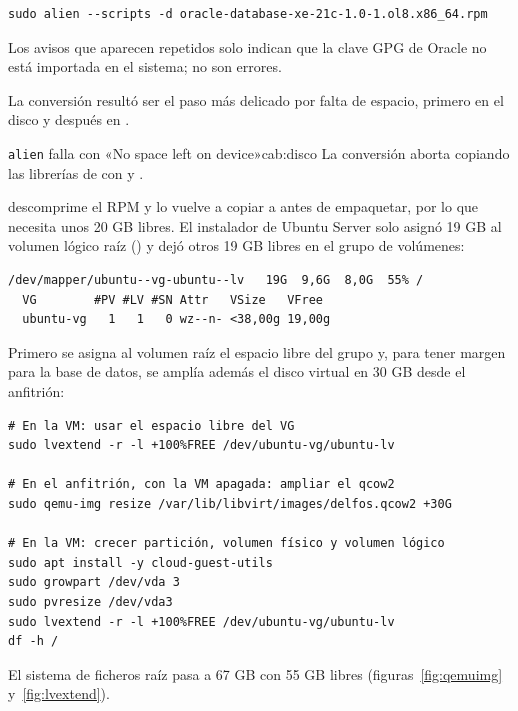 \begin{lstlisting}[style=bash]
sudo alien --scripts -d oracle-database-xe-21c-1.0-1.ol8.x86_64.rpm
\end{lstlisting}

Los avisos  que aparecen repetidos solo indican que la clave GPG de
Oracle no está importada en el sistema; no son errores.


La conversión resultó ser el paso más delicado por falta de espacio, primero en
el disco y después en .

\begin{cabezazo}{\texttt{alien} falla con «No space left on device»}{cab:disco}
\problema La conversión aborta copiando las librerías de
 con  y
.

\causa {} descomprime el RPM y lo vuelve a copiar a
 antes de empaquetar, por lo que necesita unos 20 GB libres. El
instalador de Ubuntu Server solo asignó 19 GB al volumen lógico raíz
() y dejó otros 19 GB libres en el grupo de volúmenes:

\begin{lstlisting}[style=fichero]
/dev/mapper/ubuntu--vg-ubuntu--lv   19G  9,6G  8,0G  55% /
  VG        #PV #LV #SN Attr   VSize   VFree
  ubuntu-vg   1   1   0 wz--n- <38,00g 19,00g
\end{lstlisting}

\solucion Primero se asigna al volumen raíz el espacio libre del grupo y,
para tener margen para la base de datos, se amplía además el disco virtual en
30 GB desde el anfitrión:

\begin{lstlisting}[style=bash]
# En la VM: usar el espacio libre del VG
sudo lvextend -r -l +100%FREE /dev/ubuntu-vg/ubuntu-lv

# En el anfitrión, con la VM apagada: ampliar el qcow2
sudo qemu-img resize /var/lib/libvirt/images/delfos.qcow2 +30G

# En la VM: crecer partición, volumen físico y volumen lógico
sudo apt install -y cloud-guest-utils
sudo growpart /dev/vda 3
sudo pvresize /dev/vda3
sudo lvextend -r -l +100%FREE /dev/ubuntu-vg/ubuntu-lv
df -h /
\end{lstlisting}

El sistema de ficheros raíz pasa a 67 GB con 55 GB libres
(figuras~\ref{fig:qemuimg} y~\ref{fig:lvextend}).
\end{cabezazo}

